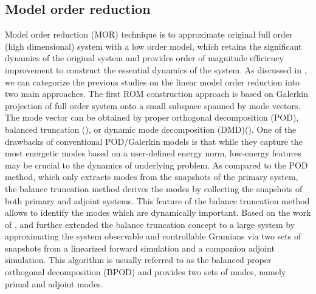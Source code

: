 \documentclass{jfm}
\begin{document}
\subsection{Model order reduction}
Model order reduction (MOR) technique is to approximate original full order (high dimensional) 
system with a low order model, which retains the significant dynamics of 
the original system and provides order of magnitude efficiency improvement 
to construct the essential dynamics of the system. 
%
As discussed in \cite{Flinois2016}, we can categorize the previous studies on the linear model 
order reduction into two main approaches. 
%
The first ROM construction approach is based on Galerkin projection of full 
order system onto a small subspace spanned by mode vectors. 
The mode vector can be obtained by proper orthogonal decomposition (POD), balanced 
truncation (\cite{Moore1981}), or dynamic mode decomposition 
(DMD)(\cite{rowley2009,schmid2010}).
%
One of the drawbacks of conventional POD/Galerkin models is that while they capture 
the most energetic modes based on a user-defined energy norm, low-energy features may be
crucial to the dynamics of underlying problem.
%
As compared to the POD method, which only extracts modes 
from the snapshots of the primary system, the balance truncation method derives the modes 
by collecting the snapshots of both primary and adjoint systems. This feature of 
the balance truncation method allows to identify the modes which are dynamically important. 
Based on the work of \cite{Moore1981}, \cite{Willcox2002} and \cite{Rowley2005} further extended the balance truncation concept 
to a large system by approximating the system observable and controllable Gramians 
via two sets of snapshots from a linearized forward simulation 
and a companion adjoint simulation. 
This algorithm is usually referred to as the balanced proper orthogonal decomposition (BPOD) 
and provides two sets of modes, namely primal and adjoint modes. 
\end{document}
